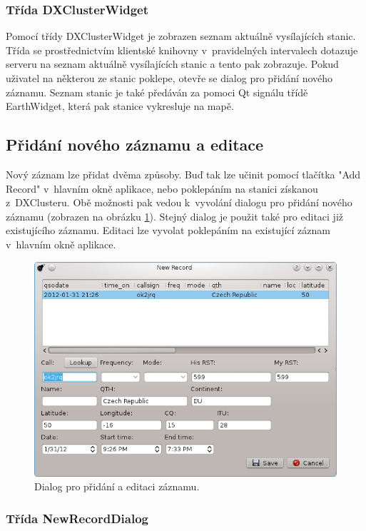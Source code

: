 \subsubsection{Třída DXClusterWidget}

Pomocí třídy DXClusterWidget je zobrazen seznam aktuálně vysílajících stanic. Třída se prostřednictvím klientské knihovny
v~pravidelných intervalech dotazuje
serveru na seznam aktuálně vysílajících stanic a tento pak zobrazuje. Pokud uživatel na některou ze stanic poklepe, otevře se 
dialog pro přidání nového záznamu. Seznam stanic je také předáván za pomoci Qt signálu třídě EarthWidget, která pak stanice
vykresluje na mapě.

\subsection{Přidání nového záznamu a editace}

Nový záznam lze přidat dvěma způsoby. Buď tak lze učinit pomocí tlačítka "Add Record" v~hlavním okně aplikace, nebo poklepáním
na stanici získanou z~DXClusteru. Obě možnosti pak vedou k~vyvolání dialogu pro přidání nového záznamu
(zobrazen na obrázku \ref{fig:novy_zaznam}). Stejný dialog je použit
také pro editaci již existujícího záznamu. Editaci lze vyvolat poklepáním na existující záznam v~hlavním okně aplikace.

\begin{figure}[h]
\centering
\includegraphics[trim=0cm 0cm 0cm 0cm, scale=0.9]{fig/ham4}
\caption{Dialog pro přidání a editaci záznamu.}
\label{fig:novy_zaznam}
\end{figure}

\subsubsection{Třída NewRecordDialog}

